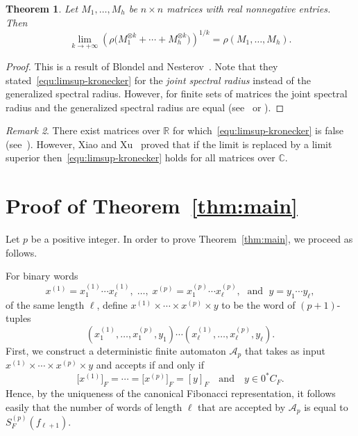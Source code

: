 \documentclass[11pt]{article}
\newtheorem{theorem}{Theorem}[section]
\theoremstyle{remark}\newtheorem{remark}[theorem]{Remark}
\begin{document}
\begin{theorem}\label{thm:kronecker-power}
	Let $M_1, \dots, M_h$ be $n \times n$ matrices with real nonnegative entries.
	Then
	\begin{equation}\label{equ:limsup-kronecker}
		\lim_{k \to +\infty} \left(\rho\big(M_1^{\otimes k} + \cdots + M_h^{\otimes k}\big)\right)^{1/k} = \rho(M_1, \dots, M_h) .
	\end{equation}
\end{theorem}
\begin{proof}
	This is a result of Blondel and Nesterov~\cite{MR2176820}.
	Note that they stated~\eqref{equ:limsup-kronecker} for the \emph{joint spectral radius} instead of the generalized spectral radius.
	However, for finite sets of matrices the joint spectral radius and the generalized spectral radius are equal (see~\cite[Theorem~IV]{MR1152485} or \cite[Theorem~1$^\prime$]{MR1334574}).
\end{proof}

\begin{remark}
	There exist matrices over $\mathbb{R}$ for which~\eqref{equ:limsup-kronecker} is false (see~\cite[last paragraph of p.~1532]{MR2889254}).
	However, Xiao and Xu~\cite{MR2889254} proved that if the limit is replaced by a limit superior then~\eqref{equ:limsup-kronecker} holds for all matrices over $\mathbb{C}$.
\end{remark}

\section{Proof of Theorem~\ref{thm:main}}

Let $p$ be a positive integer.
In order to prove Theorem~\ref{thm:main}, we proceed as follows.

\noindent
For binary words
\begin{equation*}
	x^{(1)} = x_1^{(1)}\cdots x_\ell^{(1)},\;
	\dots ,\;
	x^{(p)} = x_1^{(p)}\cdots x_\ell^{(p)},\; \text{ and }\;
	y = y_1\cdots y_\ell,
\end{equation*}
of the same length $\ell$, define $x^{(1)} \times \cdots \times x^{(p)} \times y$ to be the word of $(p+1)$-tuples
\begin{equation*}
	(x^{(1)}_1, \dots, x^{(p)}_1, y_1) \cdots (x^{(1)}_\ell, \dots, x^{(p)}_\ell, y_\ell) .
\end{equation*}
First, we construct a deterministic finite automaton $\mathcal{A}_p$ that takes as input $x^{(1)} \times \cdots \times x^{(p)} \times y$ and accepts if and only if
\begin{equation}\label{equ:accept-p}
	\big[x^{(1)}\big]_F = \cdots = \big[x^{(p)}\big]_F = [y]_F \quad \text{and} \quad y \in 0^* C_F .
\end{equation}
Hence, by the uniqueness of the canonical Fibonacci representation, it follows easily that the number of words of length $\ell$ that are accepted by $\mathcal{A}_p$ is equal to $S^{(p)}_F(f_{\ell+1})$.
\end{document}
